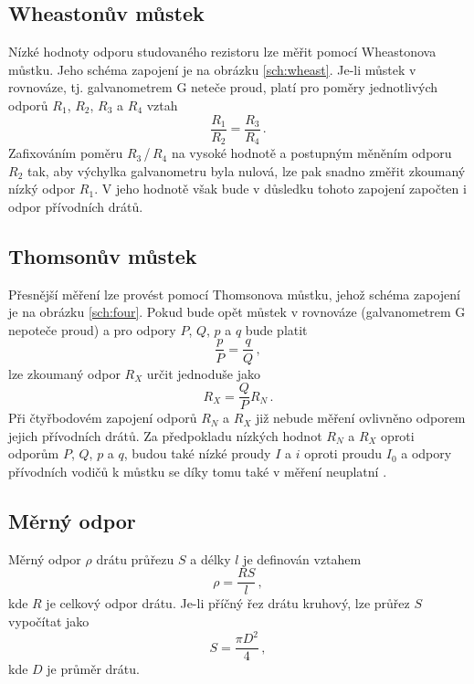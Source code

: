 \documentclass{../concepts/prepareprotokol} %
\begin{document}
\subsection{Wheastonův můstek}

Nízké hodnoty odporu studovaného rezistoru lze měřit pomocí Wheastonova můstku. Jeho schéma zapojení je na obrázku \ref{sch:wheast}. Je-li můstek v rovnováze, tj. galvanometrem G neteče proud, platí pro poměry jednotlivých odporů $R_1$, $R_2$, $R_3$ a $R_4$ vztah \cite{studijni}
\begin{equation}
    \frac{R_1}{R_2} = \frac{R_3}{R_4} \, .
\end{equation}
Zafixováním poměru $R_3$\,/\,$R_4$ na vysoké hodnotě a postupným měněním odporu $R_2$ tak, aby výchylka galvanometru byla nulová, lze pak snadno změřit zkoumaný nízký odpor $R_1$. V jeho hodnotě však bude v důsledku tohoto zapojení započten i odpor přívodních drátů.

\subsection{Thomsonův můstek}

Přesnější měření lze provést pomocí Thomsonova můstku, jehož schéma zapojení je na obrázku \ref{sch:four}. Pokud bude opět můstek v rovnováze (galvanometrem G nepoteče proud) a pro odpory $P$, $Q$, $p$ a $q$ bude platit
\begin{equation}
    \frac{p}{P} = \frac{q}{Q} \, ,
\end{equation}
lze zkoumaný odpor $R_X$ určit jednoduše jako \cite{studijni}
\begin{equation} \label{eq:thomson}
    R_X = \frac{Q}{P} R_N \, .
\end{equation}
Při čtyřbodovém zapojení odporů $R_N$ a $R_X$ již nebude měření ovlivněno odporem jejich přívodních drátů. Za předpokladu nízkých hodnot $R_N$ a $R_X$ oproti odporům $P$, $Q$, $p$ a $q$, budou také nízké proudy $I$ a $i$ oproti proudu $I_0$ a odpory přívodních vodičů k můstku se díky tomu také v měření neuplatní \cite{studijni}.

\subsection{Měrný odpor}

Měrný odpor $\rho$ drátu průřezu $S$ a délky $l$ je definován vztahem \cite{studijni}
\begin{equation} \label{eq:rho}
    \rho = \frac{R S}{l} \, ,
\end{equation}
kde $R$ je celkový odpor drátu. Je-li příčný řez drátu kruhový, lze průřez $S$ vypočítat jako
\begin{equation} \label{eq:s}
    S = \frac{\pi D^2}{4} \, ,
\end{equation}
kde $D$ je průměr drátu.
\end{document}
